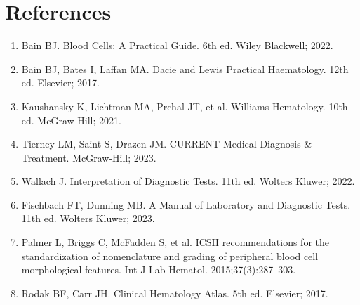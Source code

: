 \section*{References}
\begin{enumerate}
  \item Bain BJ. Blood Cells: A Practical Guide. 6th ed. Wiley Blackwell; 2022.
  \item Bain BJ, Bates I, Laffan MA. Dacie and Lewis Practical Haematology. 12th ed. Elsevier; 2017.
  \item Kaushansky K, Lichtman MA, Prchal JT, et al. Williams Hematology. 10th ed. McGraw-Hill; 2021.
  \item Tierney LM, Saint S, Drazen JM. CURRENT Medical Diagnosis \& Treatment. McGraw-Hill; 2023.
  \item Wallach J. Interpretation of Diagnostic Tests. 11th ed. Wolters Kluwer; 2022.
  \item Fischbach FT, Dunning MB. A Manual of Laboratory and Diagnostic Tests. 11th ed. Wolters Kluwer; 2023.
  \item Palmer L, Briggs C, McFadden S, et al. ICSH recommendations for the standardization of nomenclature and grading of peripheral blood cell morphological features. Int J Lab Hematol. 2015;37(3):287--303.
  \item Rodak BF, Carr JH. Clinical Hematology Atlas. 5th ed. Elsevier; 2017.
\end{enumerate}

\clearpage
